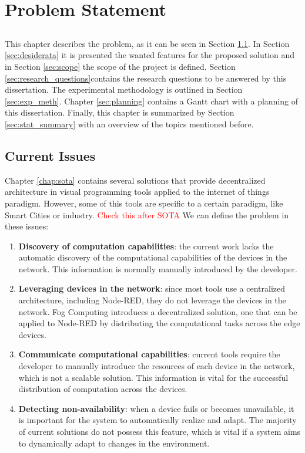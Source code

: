 \chapter{Problem Statement} \label{chap:problem_statement}

\section*{}

This chapter describes the problem, as it can be seen in Section \ref{sec:current_issues}. In Section \ref{sec:desiderata} it is presented the wanted features for the proposed solution and in Section \ref{sec:scope} the scope of the project is defined. Section \ref{sec:research_questions}contains the research questions to be answered by this dissertation. The experimental methodology is outlined in Section \ref{sec:exp_meth}. Chapter \ref{sec:planning} contains a Gantt chart with a planning of this dissertation. Finally, this chapter is summarized by Section \ref{sec:stat_summary} with an overview of the topics mentioned before.

\section{Current Issues}\label{sec:current_issues}

Chapter \ref{chap:sota} contains several solutions that provide decentralized architecture in visual programming tools applied to the internet of things paradigm. However, some of this tools are specific to a certain paradigm, like Smart Cities or industry. \textcolor{red}{Check this after SOTA}
We can define the problem in these issues:
\begin{enumerate}
    \item \textbf{Discovery of computation capabilities}: the current work lacks the automatic discovery of the computational capabilities of the devices in the network. This information is normally manually introduced by the developer.
    \item \textbf{Leveraging devices in the network}: since most tools use a centralized architecture, including Node-RED, they do not leverage the devices in the network. Fog Computing introduces a decentralized solution, one that can be applied to Node-RED by distributing the computational tasks across the edge devices.
    \item \textbf{Communicate computational capabilities}: current tools require the developer to manually introduce the resources of each device in the network, which is not a scalable solution. This information is vital for the successful distribution of computation across the devices.
    \item \textbf{Detecting non-availability}: when a device fails or becomes unavailable, it is important for the system to automatically realize and adapt. The majority of current solutions do not possess this feature, which is vital if a system aims to dynamically adapt to changes in the environment.
\end{enumerate}

